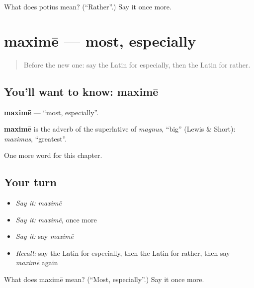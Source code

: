 \begin{tcolorbox}[breakable,colback=teal!4,colframe=teal!35!black,title={Before you move on}]
What does potius mean? (\textquotedblleft{}Rather\textquotedblright{}.) Say it once more.
\end{tcolorbox}
\section[maximē]{maximē — most, especially}

\label{lesson:LA-C179-maxime}



\begin{quote}
Before the new one: say the Latin for especially, then the Latin for rather.
\end{quote}

\subsection*{You'll want to know: maximē}
\textbf{maximē} — \textquotedblleft{}most, especially\textquotedblright{}.

\begin{cousinweb}
\textbf{maximē} is the adverb of the superlative of \emph{magnus}, \textquotedblleft{}big\textquotedblright{} (Lewis \& Short): \emph{maximus}, \textquotedblleft{}greatest\textquotedblright{}.
\end{cousinweb}

\begin{grammarlens}[title={What you've built}]
One more word for this chapter.
\end{grammarlens}

\subsection*{Your turn}
\begin{itemize}
\raggedright
  \item \emph{Say it:} \emph{maximē}
  \item \emph{Say it:} \emph{maximē}, once more
  \item \emph{Say it:} say \emph{maximē}
  \item \emph{Recall:} say the Latin for especially, then the Latin for rather, then say \emph{maximē} again
\end{itemize}

\begin{tcolorbox}[breakable,colback=teal!4,colframe=teal!35!black,title={Before you move on}]
What does maximē mean? (\textquotedblleft{}Most, especially\textquotedblright{}.) Say it once more.
\end{tcolorbox}

